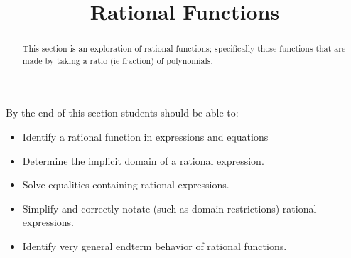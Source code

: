\documentclass{ximeraXloud}
\title{Rational Functions}
\begin{document}
\begin{abstract}
    This section is an exploration of rational functions; specifically those functions that are made by taking a ratio (ie fraction) of polynomials.
\end{abstract}
\maketitle
By the end of this section students should be able to:

\begin{itemize}
    \item Identify a rational function in expressions and equations
    \item Determine the implicit domain of a rational expression.
    \item Solve equalities containing rational expressions.
    \item Simplify and correctly notate (such as domain restrictions) rational expressions.
    \item Identify very general endterm behavior of rational functions.
\end{itemize}


%
\end{document}
